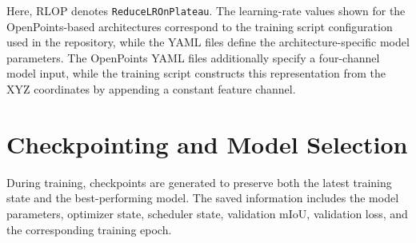 \begin{table}[H]
\centering
\caption{Summary of model-specific training configurations.}
\label{tab:app_training_summary}
\end{table}

Here, RLOP denotes \texttt{ReduceLROnPlateau}. The learning-rate values shown for the OpenPoints-based architectures correspond to the training script configuration used in the repository, while the YAML files define the architecture-specific model parameters. The OpenPoints YAML files additionally specify a four-channel model input, while the training script constructs this representation from the XYZ coordinates by appending a constant feature channel.

\section{Checkpointing and Model Selection}
\label{app:checkpointing}

During training, checkpoints are generated to preserve both the latest training state and the best-performing model. The saved information includes the model parameters, optimizer state, scheduler state, validation mIoU, validation loss, and the corresponding training epoch.

